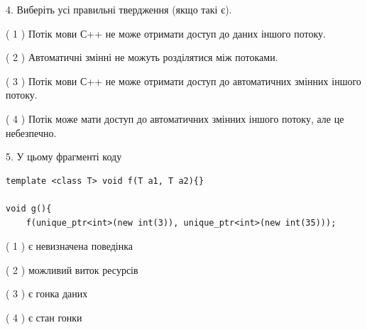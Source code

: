 \documentclass[12pt, ukrainian]{article}
\begin{document}
\begin {large}
{%
4. Виберіть усі правильні твердження (якщо такі є).\par
\vspace{2mm}

( 1 ) Потік мови С++ не може отримати доступ до даних іншого потоку.%

( 2 ) Автоматичні змінні не можуть розділятися між потоками.%

( 3 ) Потік мови С++ не може отримати доступ до автоматичних змінних іншого потоку.%

( 4 ) Потік може мати доступ до автоматичних змінних іншого потоку, але це небезпечно.%


5. У цьому фрагменті коду
\begin{verbatim}
template <class T> void f(T a1, T a2){}

void g(){
    f(unique_ptr<int>(new int(3)), unique_ptr<int>(new int(35)));
\end{verbatim}

( 1 ) є невизначена поведінка%

( 2 ) можливий виток ресурсів%

( 3 ) є гонка даних%

( 4 ) є стан гонки%
}
\end {large}
\end{document}
